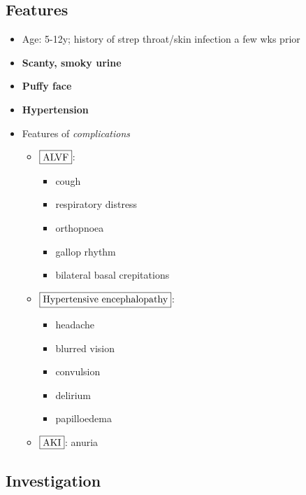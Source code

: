 \documentclass[
  12pt,
]{memoir}
\providecommand{\tightlist}{%
  \setlength{\itemsep}{0pt}\setlength{\parskip}{0pt}}
\begin{document}
\hypertarget{features-22}{%
\subsection{Features}\label{features-22}}

\begin{itemize}
\tightlist
\item
  Age: 5-12y; history of strep throat/skin infection a few wks prior
\item
  \textbf{Scanty, smoky urine}
\item
  \textbf{Puffy face}
\item
  \textbf{Hypertension}
\item
  Features of \emph{complications}

  \begin{itemize}
  \tightlist
  \item
    \(\fbox{ALVF}\):

    \begin{itemize}
    \tightlist
    \item
      cough
    \item
      respiratory distress
    \item
      orthopnoea
    \item
      gallop rhythm
    \item
      bilateral basal crepitations
    \end{itemize}
  \item
    \(\fbox{Hypertensive encephalopathy}\):

    \begin{itemize}
    \tightlist
    \item
      headache
    \item
      blurred vision
    \item
      convulsion
    \item
      delirium
    \item
      papilloedema
    \end{itemize}
  \item
    \(\fbox{AKI}\): anuria
  \end{itemize}
\end{itemize}

\hypertarget{investigation-23}{%
\subsection{Investigation}\label{investigation-23}}
\end{document}
